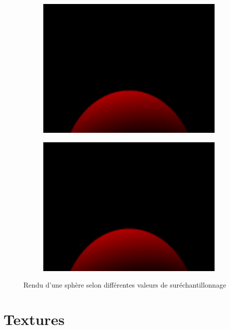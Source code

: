 \documentclass{article}
\begin{document}
\begin{figure}[hb]
  \begin{subfigure}{0.45\textwidth}
    \includegraphics[width=1\textwidth]{images/super3.png}
  \end{subfigure}
  \begin{subfigure}{0.45\textwidth}
    \includegraphics[width=1\textwidth]{images/super4.png}
  \end{subfigure}
  \caption{Rendu d'une sphère selon différentes valeurs de suréchantillonnage\label{superresults}}
\end{figure}

\section{Textures}
\end{document}
